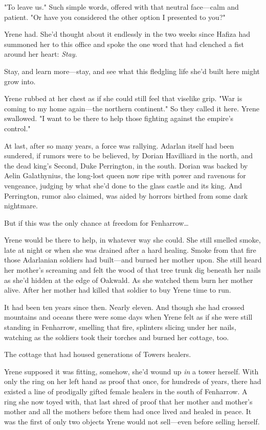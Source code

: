 "To leave us." Such simple words, offered with that neutral face---calm and patient. "Or have you considered the other option I presented to you?"

Yrene had. She'd thought about it endlessly in the two weeks since Hafiza had summoned her to this office and spoke the one word that had clenched a fist around her heart: \emph{Stay}.

Stay, and learn more---stay, and see what this fledgling life she'd built here might grow into.

Yrene rubbed at her chest as if she could still feel that viselike grip. "War is coming to my home again---the northern continent." So they called it here. Yrene swallowed. "I want to be there to help those fighting against the empire's control."

At last, after so many years, a force was rallying. Adarlan itself had been sundered, if rumors were to be believed, by Dorian Havilliard in the north, and the dead king's Second, Duke Perrington, in the south. Dorian was backed by Aelin Galathynius, the long-lost queen now ripe with power and ravenous for vengeance, judging by what she'd done to the glass castle and its king. And Perrington, rumor also claimed, was aided by horrors birthed from some dark nightmare.

But if this was the only chance at freedom for Fenharrow\ldots

Yrene would be there to help, in whatever way she could. She still smelled smoke, late at night or when she was drained after a hard healing. Smoke from that fire those Adarlanian soldiers had built---and burned her mother upon. She still heard her mother's screaming and felt the wood of that tree trunk dig beneath her nails as she'd hidden at the edge of Oakwald. As she watched them burn her mother alive. After her mother had killed that soldier to buy Yrene time to run.

It had been ten years since then. Nearly eleven. And though she had crossed mountains and oceans  there were some days when Yrene felt as if she were still standing in Fenharrow, smelling that fire, splinters slicing under her nails, watching as the soldiers took their torches and burned her cottage, too.

The cottage that had housed generations of Towers healers.

Yrene supposed it was fitting, somehow, she'd wound up \emph{in} a tower herself. With only the ring on her left hand as proof that once, for hundreds of years, there had existed a line of prodigally gifted female healers in the south of Fenharrow. A ring she now toyed with, that last shred of proof that her mother and mother's mother and all the mothers before them had once lived and healed in peace. It was the first of only two objects Yrene would not sell---even before selling herself.

